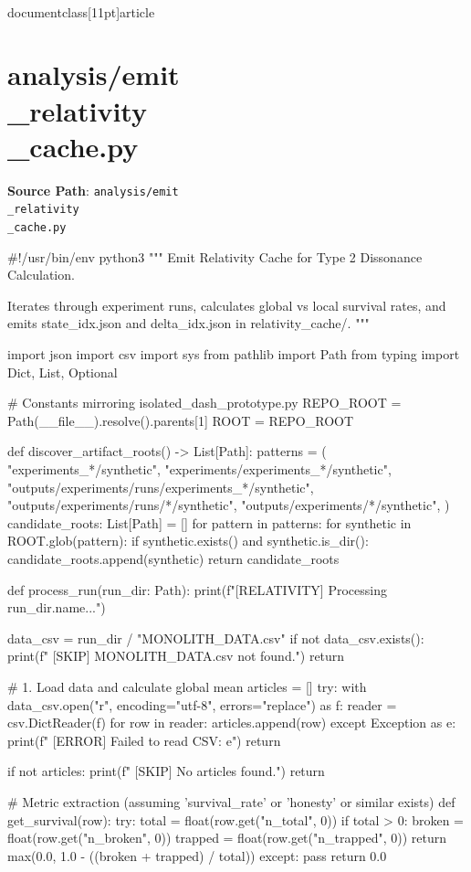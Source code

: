 \\documentclass[11pt]{article}
\begin{document}
\section*{analysis/emit\\_relativity\\_cache.py}
\textbf{Source Path}: \texttt{analysis/emit\\_relativity\\_cache.py}\par
\bigskip
\begin{CodeBlock}
#!/usr/bin/env python3
"""
Emit Relativity Cache for Type 2 Dissonance Calculation.

Iterates through experiment runs, calculates global vs local survival rates,
and emits state_{idx}.json and delta_{idx}.json in relativity_cache/.
"""

import json
import csv
import sys
from pathlib import Path
from typing import Dict, List, Optional

# Constants mirroring isolated_dash_prototype.py
REPO_ROOT = Path(__file__).resolve().parents[1]
ROOT = REPO_ROOT

def discover_artifact_roots() -> List[Path]:
    patterns = (
        "experiments_*/synthetic",
        "experiments/experiments_*/synthetic",
        "outputs/experiments/runs/experiments_*/synthetic",
        "outputs/experiments/runs/*/synthetic",
        "outputs/experiments/*/synthetic",
    )
    candidate_roots: List[Path] = []
    for pattern in patterns:
        for synthetic in ROOT.glob(pattern):
            if synthetic.exists() and synthetic.is_dir():
                candidate_roots.append(synthetic)
    return candidate_roots

def process_run(run_dir: Path):
    print(f"[RELATIVITY] Processing {run_dir.name}...")
    
    data_csv = run_dir / "MONOLITH_DATA.csv"
    if not data_csv.exists():
        print(f"  [SKIP] MONOLITH_DATA.csv not found.")
        return

    # 1. Load data and calculate global mean
    articles = []
    try:
        with data_csv.open("r", encoding="utf-8", errors="replace") as f:
            reader = csv.DictReader(f)
            for row in reader:
                articles.append(row)
    except Exception as e:
        print(f"  [ERROR] Failed to read CSV: {e}")
        return

    if not articles:
        print(f"  [SKIP] No articles found.")
        return

    # Metric extraction (assuming 'survival_rate' or 'honesty' or similar exists)
    def get_survival(row):
        try:
            total = float(row.get("n_total", 0))
            if total > 0:
                broken = float(row.get("n_broken", 0))
                trapped = float(row.get("n_trapped", 0))
                return max(0.0, 1.0 - ((broken + trapped) / total))
        except:
            pass
        return 0.0


\end{CodeBlock}
\end{document}
